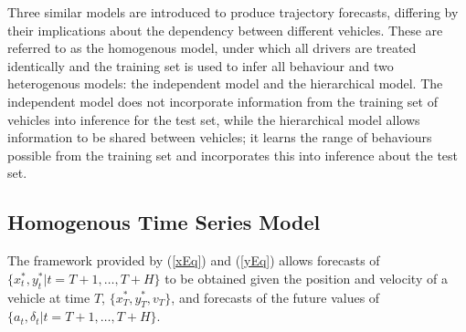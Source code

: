\documentclass[12pt,a4paper]{article}\usepackage[]{graphicx}\usepackage[]{color}
\begin{document}
Three similar models are introduced to produce trajectory forecasts, differing by their implications about the dependency between different vehicles. These are referred to as the homogenous model, under which all drivers are treated identically and the training set is used to infer all behaviour and two heterogenous models: the independent model and the hierarchical model. The independent model does not incorporate information from the training set of vehicles into inference for the test set, while the hierarchical model allows information to be shared between vehicles; it learns the range of behaviours possible from the training set and incorporates this into inference about the test set.

\subsection{Homogenous Time Series Model}
\label{subsec:homogenous}

The framework provided by (\ref{xEq}) and (\ref{yEq}) allows forecasts of $\{x^*_{t}, y^*_{t} | t = T + 1, \dots, T+H\}$ to be obtained given the position and velocity of a vehicle at time $T$, $\{x^*_T, y^*_T, v_T\}$, and forecasts of the future values of 
$\{a_{t}, \delta_{t} | t = T + 1, \dots, T+H\}$.  
\\

\iffalse %
This is highlighted in Figure \ref{fig:dynamics}, where the left panel plots the mean value of
\begin{equation}
A_{i, t} = \frac{a_{i, \tau_i + t}}{a_{i, \tau_i}}
\label{amax}
\end{equation}
where $\tau_i = \arg \underset{t}{\max}|a_{i, t}|$. On average, large vehicle acceleration or deceleration is preceeded by an increase in acceleration in the same direction for 400 milliseconds. The right panel plots the mean value of
\begin{equation}
D_{i, t} = \frac{\delta_{i, \omega_i + t} - \pi/2}{\delta_{i, \omega_i} - \pi/2}
\label{dmax}
\end{equation}
where $\omega_i = \arg \underset{t}{\max}|\delta_{i, t} - \pi/2|$, which similarly demonstrates that steering angle deviation from $\pi/2$ are associated with smaller deviations in the same direction in during the previous 300 milliseconds. 
\begin{figure}[ht]
\centering
\texttt{[image: dynamics]}
\caption{Left: Mean values of acceleration as a percent of a vehicles maximum absolute acceleration for the 1000 milliseconds before, and 500 milliseconds after, a vehicle reaches its maximum absolute acceleration. Right: The analogous plot for the steering angle, where deviations in angle from $\pi/2$ are plotted as a percentage of a vehicles maximum absolute value of deviation. The few observations before either variable reaches its maximum often have increased values in the same direction.}
\label{fig:dynamics}
\end{figure}
\fi
\end{document}
